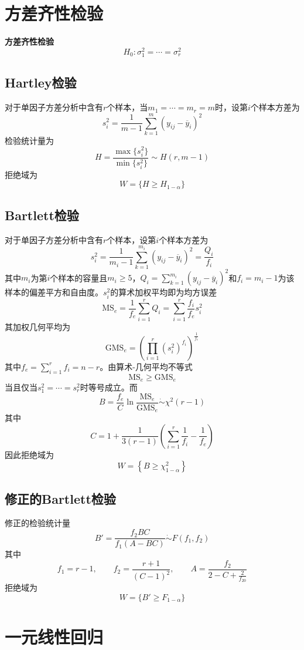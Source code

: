 \documentclass[lang = cn, scheme = chinese, thmcnt = section]{elegantbook}
\begin{document}
\section{方差齐性检验}

\textbf{方差齐性检验}
$$
H_0:\sigma_1^2=\cdots=\sigma_r^2
$$

\subsection{Hartley检验}

对于单因子方差分析中含有$r$个样本，当$m_1=\cdots=m_r=m$时，设第$i$个样本方差为
$$
s_i^2=\frac{1}{m-1}\sum_{k=1}^{m}(y_{ij}-\overline{y}_i)^2
$$
检验统计量为
$$
H=\frac{\max\{ s_i^2 \}}{\min\{s_i^2\}}\sim H(r,m-1)
$$
拒绝域为
$$
W=\{ H\ge H_{1-\alpha} \}
$$

\subsection{Bartlett检验}

对于单因子方差分析中含有$r$个样本，设第$i$个样本方差为
$$
s_i^2=\frac{1}{m_i-1}\sum_{k=1}^{m_i}(y_{ij}-\overline{y}_i)^2=\frac{Q_i}{f_i}
$$
其中$m_i$为第$i$个样本的容量且$m_i\ge 5$，$Q_i=\sum_{k=1}^{m_i}(y_{ij}-\overline{y}_i)^2$和$f_i=m_i-1$为该样本的偏差平方和自由度。$s_i^2$的算术加权平均即为均方误差
$$
\mathrm{MS}_e=\frac{1}{f_e}\sum_{i=1}^{r}Q_i=\sum_{i=1}^{r}\frac{f_i}{f_e}s_i^2
$$
其加权几何平均为
$$
\mathrm{GMS}_e=\left( \prod_{i=1}^{r}(s_i^2)^{f_i} \right)^{\frac{1}{f_e}}
$$
其中$f_e=\sum_{i=1}^{r}f_i=n-r$。由算术-几何平均不等式
$$
\mathrm{MS}_e\ge \mathrm{GMS}_e
$$
当且仅当$s_1^2=\cdots=s_r^2$时等号成立。而
$$
B=\frac{f_e}{C}\ln\frac{\mathrm{MS}_e}{\mathrm{GMS}_e}\dot{\sim} \chi^2(r-1)
$$
其中
$$
C=1+\frac{1}{3(r-1)}\left( \sum_{i=1}^{r}\frac{1}{f_i}-\frac{1}{f_e} \right)
$$
因此拒绝域为
$$
W=\left\{ B\ge\chi^2_{1-\alpha} \right\}
$$

\subsection{修正的Bartlett检验}

修正的检验统计量
$$
B'=\frac{f_2BC}{f_1(A-BC)}\dot{\sim}F(f_1,f_2)
$$
其中
$$
f_1=r-1,\qquad f_2=\frac{r+1}{(C-1)^2},\qquad A=\frac{f_2}{2-C+\frac{2}{f_20}}
$$
拒绝域为
$$
W=\{ B'\ge F_{1-\alpha} \}
$$

\section{一元线性回归}
\end{document}
